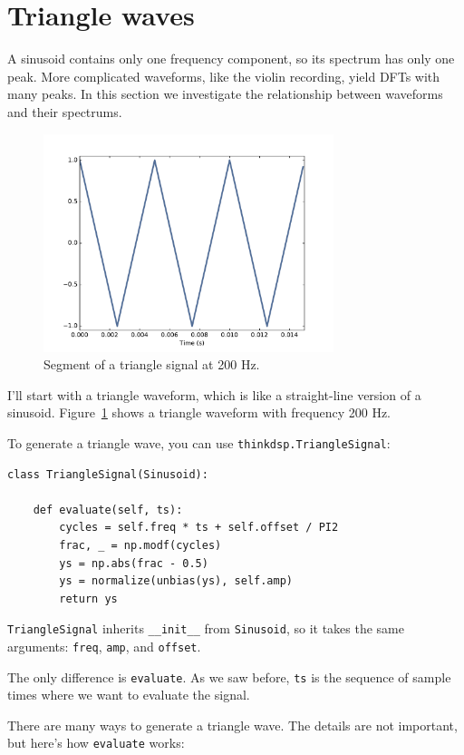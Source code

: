\documentclass[12pt]{book}
\begin{document}
\section{Triangle waves}
\label{triangle}

A sinusoid contains only one frequency component, so its spectrum
has only one peak.  More complicated waveforms, like the
violin recording, yield DFTs with many peaks.  In this section we
investigate the relationship between waveforms and their spectrums.

\begin{figure}
\centerline{\includegraphics[height=2.5in]{figs/triangle-200-1.pdf}}
\caption{Segment of a triangle signal at 200 Hz.}
\label{fig.triangle.200.1}
\end{figure}

I'll start with a triangle waveform, which is like a straight-line
version of a sinusoid.  Figure~\ref{fig.triangle.200.1} shows a
triangle waveform with frequency 200 Hz.

To generate a triangle wave, you can use {\tt thinkdsp.TriangleSignal}:

\begin{verbatim}
class TriangleSignal(Sinusoid):

    def evaluate(self, ts):
        cycles = self.freq * ts + self.offset / PI2
        frac, _ = np.modf(cycles)
        ys = np.abs(frac - 0.5)
        ys = normalize(unbias(ys), self.amp)
        return ys
\end{verbatim}

{\tt TriangleSignal} inherits \verb"__init__" from {\tt Sinusoid},
so it takes the same arguments: {\tt freq}, {\tt amp}, and {\tt offset}.

The only difference is {\tt evaluate}.  As we saw before,
{\tt ts} is the sequence of sample times where we want to
evaluate the signal.

There are many ways to generate a triangle wave.  The details
are not important, but here's how {\tt evaluate} works:
\end{document}
